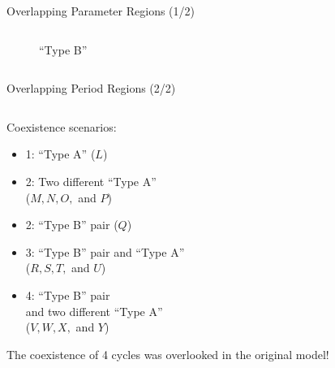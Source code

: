 \begin{frame}{Overlapping Parameter Regions (1/2)}
\begin{columns}
\begin{column}{.8 \textwidth}
\begin{figure}
{				}{``Type B''}
			\end{figure}
		\end{column}
		\begin{column}{.2 \textwidth}
			\vspace{-4em}
			\begin{figure}
			\end{figure}
		\end{column}
	\end{columns}
\end{frame}

\begin{frame}{Overlapping Period Regions (2/2)}
	\vspace{-1em}
	\begin{columns}
		\begin{column}{.5 \textwidth}
			Coexistence scenarios:
			\begin{itemize}
				\item 1: ``Type A'' ($L$)
				\item 2: Two different ``Type A'' \\ ($M, N, O,$ and $P$)
				\item 2: ``Type B'' pair ($Q$)
				\item 3: ``Type B'' pair and ``Type A'' \\ ($R, S, T,$ and $U$)
				\item 4: ``Type B'' pair \\ and two different ``Type A'' \\ ($V, W, X,$ and $Y$)
			\end{itemize}

			\vspace{.5em}
			The coexistence of 4 cycles was overlooked in the original model!
		\end{column}
		\begin{column}{.5 \textwidth}
			\vspace{-5em}
			\begin{figure}
				\centering
				\\
			\end{figure}
		\end{column}
	\end{columns}
\end{frame}

